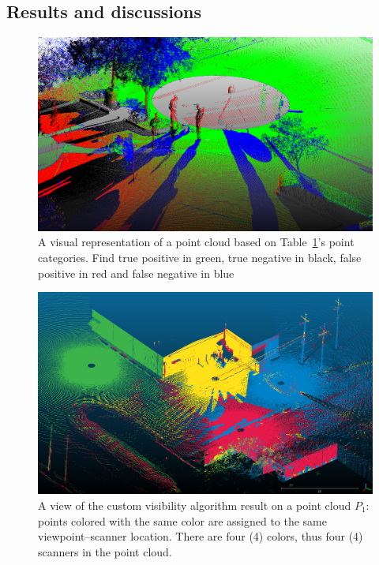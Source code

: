 \subsection{Results and discussions}
\begin{figure}
  \centering
  \includegraphics[scale=0.3]{img/positive-negative.png}
  \caption{A visual representation of a point cloud based on Table~\ref{fig:positive-negative}'s point categories. Find true positive in green, true negative in black, false positive in red and false negative in blue}
  \label{fig:positive-negative}
\end{figure}
\begin{figure}
  \centering
  \includegraphics[scale=0.35]{img/custom-result1.png}
  \caption{A view of the custom visibility algorithm result on a point cloud $P_1$: points colored with the same color are assigned to the same viewpoint--scanner location. There are four (4) colors, thus four (4) scanners in the point cloud.}
  \label{fig:custom-result1}
\end{figure}
